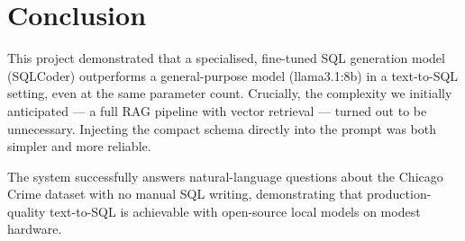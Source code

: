 \documentclass[12pt,a4paper]{article}
\begin{document}
\section{Conclusion}

This project demonstrated that a specialised, fine-tuned SQL generation model
(SQLCoder) outperforms a general-purpose model (llama3.1:8b) in a text-to-SQL
setting, even at the same parameter count.  Crucially, the complexity we initially
anticipated --- a full RAG pipeline with vector retrieval --- turned out to be
unnecessary.  Injecting the compact schema directly into the prompt was both simpler
and more reliable.

The system successfully answers natural-language questions about the Chicago Crime
dataset with no manual SQL writing, demonstrating that production-quality
text-to-SQL is achievable with open-source local models on modest hardware.
\end{document}
